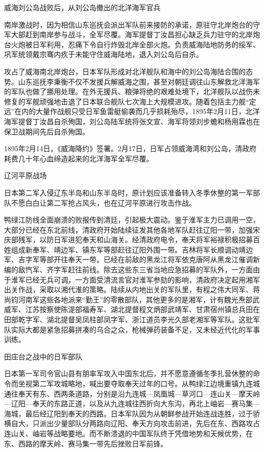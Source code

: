 \documentclass[12pt,UTF8]{ctexbook}
\begin{document}
威海刘公岛战败后，从刘公岛撤出的北洋海军官兵

南岸激战时，因为相信山东巡抚会派出军队前来接防的承诺，原驻守北岸炮台的守军大部赶到南岸参与战斗，全军尽覆。海军提督丁汝昌担心缺乏兵力驻守的北岸炮台火炮被日军利用，忍痛下令自行炸毁北岸全部火炮。负责威海陆地防务的绥军、巩军统领戴宗骞内疚于未能守住威海陆地，退入刘公岛后自杀。

攻占了威海南北岸炮台，日本军队形成对北洋舰队和海中的刘公岛海陆合围的态势。山东巡抚李秉衡不仅不发援兵解威海之围，甚至对朝廷调往山东解救北洋海军的军队也做了挪用处理。在外无援兵、粮弹将绝的艰难处境下，北洋舰队以战伤未修复的军舰顽强地击退了日本联合舰队七次海上大规模进攻。随着包括主力舰“定远”在内的大量作战舰只受日军鱼雷艇偷袭而几乎损耗殆尽，1895年2月11日，北洋海军提督丁汝昌自杀殉国，刘公岛陆军统将张文宣、海军将领刘步蟾和杨用霖也在保卫战期间先后自杀殉国。

1895年2月14日，《威海降约》签署。2月17日，日军占领威海湾和刘公岛，清政府耗费几十年心血缔造起来的北洋海军全军尽覆。

辽河平原战场

日本第二军入侵辽东半岛和山东半岛时，原计划应该准备转入冬季休整的第一军部队不愿白白让第二军抢占风头，也在辽河平原进行攻击作战。

鸭绿江防线全面崩溃的败报传到清廷，引起极大震动。鉴于淮军主力已调用一空，大部分已经在东北前线，清政府开始陆续征发其他各地军队赶往辽阳一带，加强宋庆部残军，以防日军进犯奉天和山海关。经清政府电令，奉天将军裕禄积极招募百姓组成新奉军、靖边军、镇东军等部赶往辽阳外围一带。吉林将军长顺调动靖边军、吉字军等部开往奉天一带。已经在前敌的黑龙江将军依克唐阿从黑龙江催调新编的敌忾军、齐字军赶往前线。除去这些东三省当地应急招募的军队外，一方面由于淮军已经无兵可调，一方面受清流言官对淮军参劾的影响，清政府决定起用湘军出关作战，采取以湘代淮的策略。陆续从内地出关的军队里，有程之伟大同军、蒋尚钧河南军这些各地派来“勤王”的零散部队，其他更多的是湘军，计有魏光焘部武威军、江苏按察使陈湜部福寿军、湖北提督程文炳部武靖军、甘肃宿州镇总兵田在田部乾字军、湖北提督吴凤柱部凤字军、浙江道员李光久部老湘军等军队。这批军队实际大都是紧急招募拼凑的乌合之众，枪械弹药装备不足，又未经近代化的军事训练。


田庄台之战中的日军部队

日本第一军司令官山县有朋率军攻入中国东北后，并不愿意遵循冬季扎营休整的命令而坐视第二军攻城略地，喊出要夺取奉天过年的口号。从鸭绿江边境重镇九连城通往奉天有东、西两条道路，分别是沿九连城—凤凰城—草河口—连山关—摩天岭—辽阳—奉天的东路正道，以及从九连城往西折向大东沟，再北上岫岩—赛马集—海城，最后经辽阳到奉天的西路。日本军队因为从朝鲜参战开始连战连胜，过于骄横自大，只派出少量部队分两路向辽阳、奉天方向攻击前进，先后在东、西路攻占连山关、岫岩等战略要地。而不断溃退的中国军队终于凭借地势和天候优势，在东、西路的摩天岭、赛马集一带先后挫败日军前锋。
\end{document}
